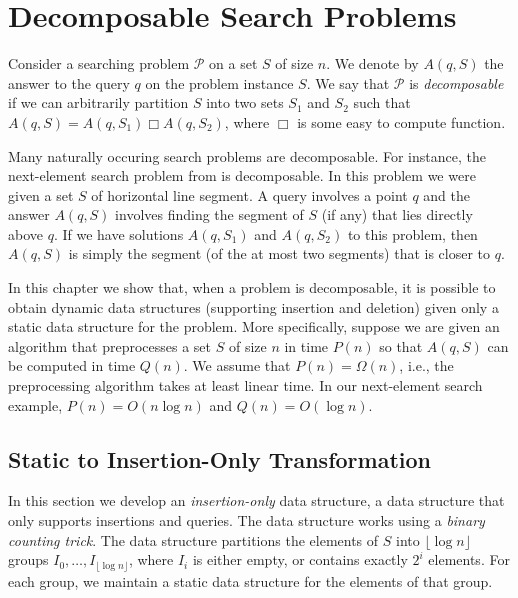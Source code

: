 \chapter{Decomposable Search Problems}


Consider a searching problem $\mathcal{P}$ on a set $S$ of size $n$.
We denote by $A(q,S)$ the answer to the query $q$ on the problem
instance $S$.  We say that $\mathcal{P}$ is \emph{decomposable} if we
can arbitrarily partition $S$ into two sets $S_1$ and $S_2$ such that
$A(q,S)=A(q,S_1)\Box A(q,S_2)$, where $\Box$ is some easy to compute
function.

Many naturally occuring search problems are decomposable.  For
instance, the next-element search problem from 
is decomposable.  In this problem we were given a set $S$ of
horizontal line segment.  A query involves a point $q$ and the answer
$A(q,S)$ involves finding the segment of $S$ (if any) that lies
directly above $q$.  If we have solutions $A(q,S_1)$ and $A(q,S_2)$ to
this problem, then $A(q,S)$ is simply the segment (of the at most two
segments) that is closer to $q$.
 
In this chapter we show that, when a problem is decomposable, it is
possible to obtain dynamic data structures (supporting insertion and
deletion) given only a static data structure for the problem.  More
specifically, suppose we are given an algorithm that preprocesses a
set $S$ of size $n$ in time $P(n)$ so that $A(q,S)$ can be computed in
time $Q(n)$.  We assume that $P(n)=\Omega(n)$, i.e., the preprocessing
algorithm takes at least linear time.  In our next-element search
example, $P(n)=O(n\log n)$ and $Q(n)=O(\log n)$.

\section{Static to Insertion-Only Transformation}

In this section we develop an \emph{insertion-only} data structure, a
data structure that only supports insertions and queries.  The data
structure works using a \emph{binary counting trick}.  The data
structure partitions the elements of $S$ into $\lfloor\log n\rfloor$
groups $I_0,\ldots,I_{\lfloor\log n\rfloor}$, where $I_i$ is either
empty, or contains exactly $2^i$ elements.  For each group, we
maintain a static data structure for the elements of that group.

